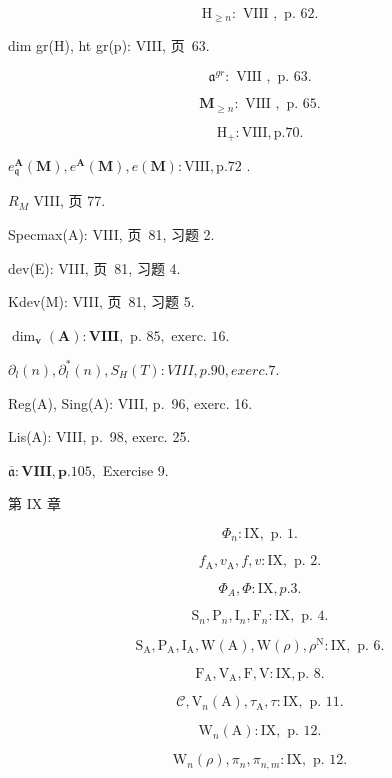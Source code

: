 \[
\mathrm{H} _ {\geqslant n}: \text { VIII }, \text { p. } 62.
\]

dim gr(H), ht gr(p): VIII, 页~63.

\[
\mathfrak {a} ^ {g r}: \text { VIII }, \text { p. } 63.
\]

\[
\mathbf {M} _ {\geqslant n}: \text { VIII }, \text { p. } 65.
\]

\[
\mathrm{H} _ {+}: \text {VIII}, \text {p.} 70.
\]

\(e_{\mathfrak{q}}^{\mathbf{A}}(\mathbf{M}), e^{\mathbf{A}}(\mathbf{M}), e(\mathbf{M}) : \mathrm{VIII}, \mathrm{p.72}\) .

\(R_{M}\) VIII, 页 77.

Specmax(A): VIII, 页~81, 习题 2.

dev(E): VIII, 页~81, 习题 4.

Kdev(M): VIII, 页~81, 习题 5.

\(\dim_{\mathbf{v}}(\mathbf{A}) : \mathbf{VIII}, \text{ p. } 85, \text{ exerc. } 16.\)

\(\partial_l(n), \partial_l^*(n), S_H(T): VIII, p. 90, exerc. 7.\)

Reg(A), Sing(A): VIII, p.~96, exerc. 16.

Lis(A): VIII, p.~98, exerc. 25.

\(\overline{\mathfrak{a}}:\mathbf{V}\mathbf{I}\mathbf{I}\mathbf{I}\mathbf{,}\mathbf{p.}105,\) Exercise 9.

第 IX 章

\[
\Phi_ {n}: \mathrm{IX}, \text { p. } 1.
\]

\[
f _ {\mathrm{A}}, v _ {\mathrm{A}}, f, v: \mathrm{IX}, \text { p. } 2.
\]

\[
\Phi_ {A}, \Phi : \mathrm{IX}, p. 3.
\]

\[
\mathrm{S} _ {n}, \mathrm{P} _ {n}, \mathrm{I} _ {n}, \mathrm{F} _ {n}: \mathrm{IX}, \text { p. } 4.
\]

\[
\mathrm{S} _ {\mathrm{A}}, \mathrm{P} _ {\mathrm{A}}, \mathrm{I} _ {\mathrm{A}}, \mathrm{W} (\mathrm{A}), \mathrm{W} (\rho), \rho^ {\mathrm{N}}: \mathrm{IX}, \text { p. } 6.
\]

\[
\mathrm{F} _ {\mathrm{A}}, \mathrm{V} _ {\mathrm{A}}, \mathrm{F}, \mathrm{V}: \mathrm{IX}, \text {p. 8.}
\]

\[
\mathcal {C}, \mathrm{V} _ {n} (\mathrm{A}), \tau_ {\mathrm{A}}, \tau : \mathrm{IX}, \text { p. } 11.
\]

\[
\mathrm{W} _ {n} (\mathrm{A}): \mathrm{IX}, \text { p. } 12.
\]

\[
\mathrm{W} _ {n} (\rho), \pi_ {n}, \pi_ {n, m}: \mathrm{IX}, \text { p. } 12.
\]

